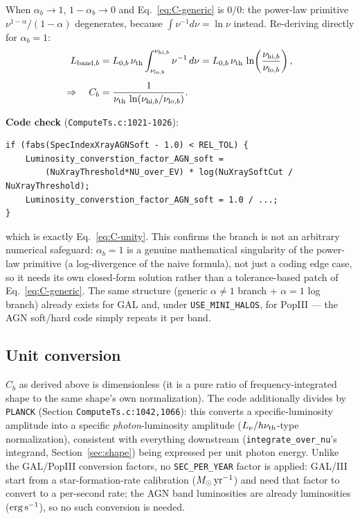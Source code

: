 \documentclass[11pt]{article}
\newcommand{\code}[1]{\texttt{#1}}
\begin{document}
When $\alpha_b \to 1$, $1-\alpha_b \to 0$ and Eq.~\eqref{eq:C-generic} is
$0/0$: the power-law primitive $\nu^{1-\alpha}/(1-\alpha)$ degenerates,
because $\int \nu^{-1}d\nu = \ln\nu$ instead. Re-deriving directly for
$\alpha_b=1$:
\begin{align}
  L_{{\rm band},b} &= L_{0,b}\,\nu_{\rm th}
     \int_{\nu_{{\rm lo},b}}^{\nu_{{\rm hi},b}} \nu^{-1}\,d\nu
   = L_{0,b}\,\nu_{\rm th}\,\ln\!\left(\frac{\nu_{{\rm hi},b}}{\nu_{{\rm lo},b}}\right), \\[4pt]
  \Rightarrow\quad
  C_b &= \frac{1}{\nu_{\rm th}\,\ln(\nu_{{\rm hi},b}/\nu_{{\rm lo},b})}.
  \label{eq:C-unity}
\end{align}

\noindent \textbf{Code check} (\code{ComputeTs.c:1021-1026}):
\begin{verbatim}
if (fabs(SpecIndexXrayAGNSoft - 1.0) < REL_TOL) {
    Luminosity_converstion_factor_AGN_soft =
        (NuXrayThreshold*NU_over_EV) * log(NuXraySoftCut / NuXrayThreshold);
    Luminosity_converstion_factor_AGN_soft = 1.0 / ...;
}
\end{verbatim}
which is exactly Eq.~\eqref{eq:C-unity}. This confirms the branch is not an
arbitrary numerical safeguard: $\alpha_b=1$ is a genuine mathematical
singularity of the power-law primitive (a log-divergence of the naive
formula), not just a coding edge case, so it needs its own closed-form
solution rather than a tolerance-based patch of Eq.~\eqref{eq:C-generic}.
The same structure (generic $\alpha\neq1$ branch + $\alpha=1$ log branch)
already exists for GAL and, under \code{USE\_MINI\_HALOS}, for PopIII —
the AGN soft/hard code simply repeats it per band.

\subsection{Unit conversion}
\label{sec:units}

$C_b$ as derived above is dimensionless (it is a pure ratio of
frequency-integrated shape to the same shape's own normalization). The code
additionally divides by \code{PLANCK} (Section \code{ComputeTs.c:1042,1066}):
this converts a specific-luminosity amplitude into a specific
\emph{photon}-luminosity amplitude ($L_\nu/h\nu_{\rm th}$-type normalization),
consistent with everything downstream (\code{integrate\_over\_nu}'s
integrand, Section~\ref{sec:shape}) being expressed per unit photon energy.
Unlike the GAL/PopIII conversion factors, no \code{SEC\_PER\_YEAR} factor is
applied: GAL/III start from a star-formation-rate calibration
($M_\odot\,{\rm yr}^{-1}$) and need that factor to convert to a per-second
rate; the AGN band luminosities are already luminosities
(${\rm erg\,s^{-1}}$), so no such conversion is needed.
\end{document}
